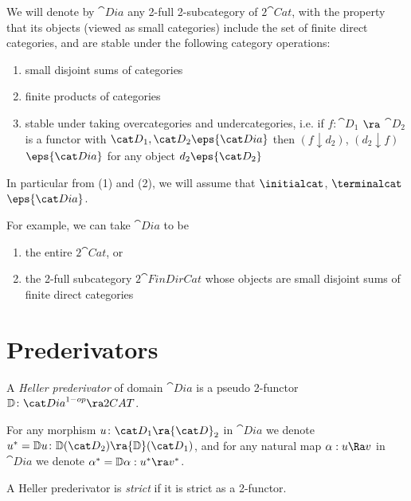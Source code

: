We will denote by ${\cat Dia}$ any 2-full 2-subcategory of $2{\cat Cat}$, with the property that its objects (viewed as small categories) include the set of finite direct categories, and are stable under the following category operations:
\begin{enumerate}
\item
small disjoint sums of categories
\item
finite products of categories
\item
stable under taking overcategories and undercategories, i.e. if $f \colon {\cat D}_1$ $\ra$ ${\cat D}_2$ is a functor with ${\cat D}_1, {\cat D}_2 \eps {\cat Dia}$ then $(f \downarrow d_2)$, $(d_2 \downarrow f)$ $\eps {\cat Dia}$ for any object $d_2 \eps {\cat D_2}$
\end{enumerate}
In particular from (1) and (2), we will assume that $\initialcat$, $\terminalcat$ $\eps {\cat Dia}$.

For example, we can take ${\cat Dia}$ to be
\begin{enumerate}
\item
the entire $2{\cat Cat}$, or
\item
the 2-full subcategory $2{\cat FinDirCat}$ whose objects are small disjoint sums of finite direct categories
\end{enumerate}

\section{Prederivators}
\label{sec:preder}

\begin{defn}
\label{defn:hellerpreder}
A {\it Heller prederivator} of domain ${\cat Dia}$ is a pseudo 2-functor ${\mathbb D} \colon {\cat Dia}^{1-op} \ra  2CAT$. 
\end{defn}

For any morphism $u \colon {\cat D}_1 \ra {\cat D}_2$ in ${\cat Dia}$ we denote $u^* = {\mathbb D}u \colon {\mathbb D}({\cat D}_2) \ra {\mathbb D}({\cat D}_1)$, and for any natural map $\alpha : u \Ra v$ in ${\cat Dia}$ we denote $\alpha^* = {\mathbb D}\alpha : u^* \ra v^*$.

A Heller prederivator is {\it strict} if it is strict as a 2-functor.


